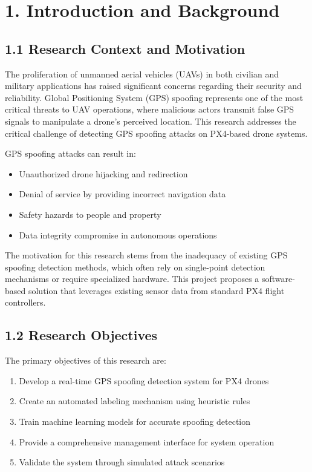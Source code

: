 \section{1. Introduction and Background}

\subsection{1.1 Research Context and Motivation}

The proliferation of unmanned aerial vehicles (UAVs) in both civilian and military applications has raised significant concerns regarding their security and reliability. Global Positioning System (GPS) spoofing represents one of the most critical threats to UAV operations, where malicious actors transmit false GPS signals to manipulate a drone's perceived location. This research addresses the critical challenge of detecting GPS spoofing attacks on PX4-based drone systems.

GPS spoofing attacks can result in:
\begin{itemize}
    \item Unauthorized drone hijacking and redirection
    \item Denial of service by providing incorrect navigation data
    \item Safety hazards to people and property
    \item Data integrity compromise in autonomous operations
\end{itemize}

The motivation for this research stems from the inadequacy of existing GPS spoofing detection methods, which often rely on single-point detection mechanisms or require specialized hardware. This project proposes a software-based solution that leverages existing sensor data from standard PX4 flight controllers.

\subsection{1.2 Research Objectives}

The primary objectives of this research are:

\begin{enumerate}
    \item Develop a real-time GPS spoofing detection system for PX4 drones
    \item Create an automated labeling mechanism using heuristic rules
    \item Train machine learning models for accurate spoofing detection
    \item Provide a comprehensive management interface for system operation
    \item Validate the system through simulated attack scenarios
\end{enumerate}

